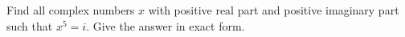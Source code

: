 Find all complex numbers $x$ with positive real part and positive imaginary part such that $x^5=i$. Give the answer in exact form.
